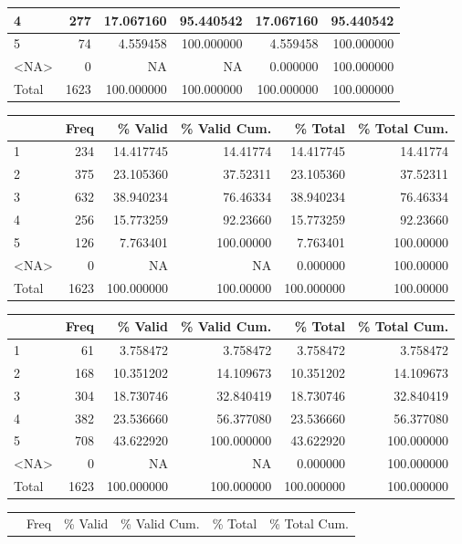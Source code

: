 \documentclass[
  letterpaper,
  DIV=11,
  numbers=noendperiod]{scrartcl}
\begin{document}
\begin{table}
\begin{tabular}[t]{l|r|r|r|r|r}
\hline
4 & 277 & 17.067160 & 95.440542 & 17.067160 & 95.440542\\
\hline
5 & 74 & 4.559458 & 100.000000 & 4.559458 & 100.000000\\
\hline
<NA> & 0 & NA & NA & 0.000000 & 100.000000\\
\hline
Total & 1623 & 100.000000 & 100.000000 & 100.000000 & 100.000000\\
\hline
\end{tabular}
\centering
\begin{tabular}[t]{l|r|r|r|r|r}
\hline
  & Freq & \% Valid & \% Valid Cum. & \% Total & \% Total Cum.\\
\hline
1 & 234 & 14.417745 & 14.41774 & 14.417745 & 14.41774\\
\hline
2 & 375 & 23.105360 & 37.52311 & 23.105360 & 37.52311\\
\hline
3 & 632 & 38.940234 & 76.46334 & 38.940234 & 76.46334\\
\hline
4 & 256 & 15.773259 & 92.23660 & 15.773259 & 92.23660\\
\hline
5 & 126 & 7.763401 & 100.00000 & 7.763401 & 100.00000\\
\hline
<NA> & 0 & NA & NA & 0.000000 & 100.00000\\
\hline
Total & 1623 & 100.000000 & 100.00000 & 100.000000 & 100.00000\\
\hline
\end{tabular}
\centering
\begin{tabular}[t]{l|r|r|r|r|r}
\hline
  & Freq & \% Valid & \% Valid Cum. & \% Total & \% Total Cum.\\
\hline
1 & 61 & 3.758472 & 3.758472 & 3.758472 & 3.758472\\
\hline
2 & 168 & 10.351202 & 14.109673 & 10.351202 & 14.109673\\
\hline
3 & 304 & 18.730746 & 32.840419 & 18.730746 & 32.840419\\
\hline
4 & 382 & 23.536660 & 56.377080 & 23.536660 & 56.377080\\
\hline
5 & 708 & 43.622920 & 100.000000 & 43.622920 & 100.000000\\
\hline
<NA> & 0 & NA & NA & 0.000000 & 100.000000\\
\hline
Total & 1623 & 100.000000 & 100.000000 & 100.000000 & 100.000000\\
\hline
\end{tabular}
\centering
\begin{tabular}[t]{l|r|r|r|r|r}
\hline
  & Freq & \% Valid & \% Valid Cum. & \% Total & \% Total Cum.\\

\end{tabular}
\end{table}
\end{document}
